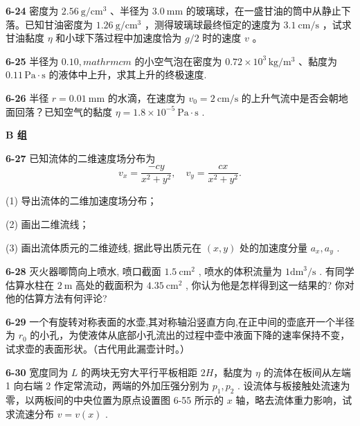 \newpage

\textbf{6-24} 密度为 $2.56 \mathrm{~g} / \mathrm{cm}^{3}$ 、半径为 $3.0 \mathrm{~mm}$ 的玻璃球，在一盛甘油的筒中从静止下落。已知甘油密度为 $1.26 \mathrm{~g} / \mathrm{cm}^{3}$ ，测得玻璃球最终恒定的速度为 $3.1 \mathrm{~cm} / \mathrm{s}$ ，试求甘油黏度 $\eta$ 和小球下落过程中加速度恰为 $g / 2$ 时的速度 $v$ 。

\newpage

\textbf{6-25} 半径为 $0.10,mathrm{cm}$ 的小空气泡在密度为 $0.72 \times 10^{3}\,\mathrm{kg/m^{3}}$ 、黏度为 $0.11\,\mathrm{Pa\cdot s}$ 的液体中上升，求其上升的终极速度.

\newpage

\textbf{6-26} 半径 $r = 0.01 \mathrm{~mm}$ 的水滴，在速度为 $v_{0} = 2 \mathrm{~cm} / \mathrm{s}$ 的上升气流中是否会朝地面回落？已知空气的黏度 $\eta = 1.8 \times 10^{-5} \mathrm{~Pa} \cdot \mathrm{s}$ .

\newpage

\begin{center}\textbf{B 组}\end{center}

\textbf{6-27} 已知流体的二维速度场分布为
\[
v _ {x} = \frac {- c y}{x ^ {2} + y ^ {2}}, \quad v _ {y} = \frac {c x}{x ^ {2} + y ^ {2}}.
\]

(1) 导出流体的二维加速度场分布；

(2) 画出二维流线；

(3) 画出流体质元的二维迹线, 据此导出质元在 $(x, y)$ 处的加速度分量 $a_x, a_y$ .

\newpage

\textbf{6-28} 灭火器唧筒向上喷水, 喷口截面 $1.5 \mathrm{~cm}^{2}$ , 喷水的体积流量为 $1 \mathrm{dm}^{3} / \mathrm{s}$ . 有同学估算水柱在 $2 \mathrm{~m}$ 高处的截面积为 $4.35 \mathrm{~cm}^{2}$ , 你认为他是怎样得到这一结果的? 你对他的估算方法有何评论?

\newpage

\textbf{6-29} 一个有旋转对称表面的水壶,其对称轴沿竖直方向,在正中间的壶底开一个半径为 $r_{0}$ 的小孔，为使液体从底部小孔流出的过程中壶中液面下降的速率保持不变，试求壶的表面形状。（古代用此漏壶计时。）

\newpage

\textbf{6-30} 宽度同为 $L$ 的两块无穷大平行平板相距 $2H$，黏度为 $\eta$ 的流体在板间从左端 1 向右端 2 作定常流动，两端的外加压强分别为 $p_{1}, p_{2}$ . 设流体与板接触处流速为零，以两板间的中央位置为原点设置图 6-55 所示的 $x$ 轴，略去流体重力影响，试求流速分布 $v = v(x)$ .

